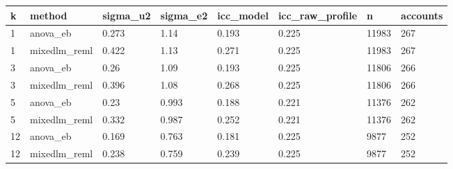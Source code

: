 \begin{tabular}{llllllll}
\toprule
k & method & sigma\_u2 & sigma\_e2 & icc\_model & icc\_raw\_profile & n & accounts \\
\midrule
1 & anova\_eb & 0.273 & 1.14 & 0.193 & 0.225 & 11983 & 267 \\
1 & mixedlm\_reml & 0.422 & 1.13 & 0.271 & 0.225 & 11983 & 267 \\
3 & anova\_eb & 0.26 & 1.09 & 0.193 & 0.225 & 11806 & 266 \\
3 & mixedlm\_reml & 0.396 & 1.08 & 0.268 & 0.225 & 11806 & 266 \\
5 & anova\_eb & 0.23 & 0.993 & 0.188 & 0.221 & 11376 & 262 \\
5 & mixedlm\_reml & 0.332 & 0.987 & 0.252 & 0.221 & 11376 & 262 \\
12 & anova\_eb & 0.169 & 0.763 & 0.181 & 0.225 & 9877 & 252 \\
12 & mixedlm\_reml & 0.238 & 0.759 & 0.239 & 0.225 & 9877 & 252 \\
\bottomrule
\end{tabular}
